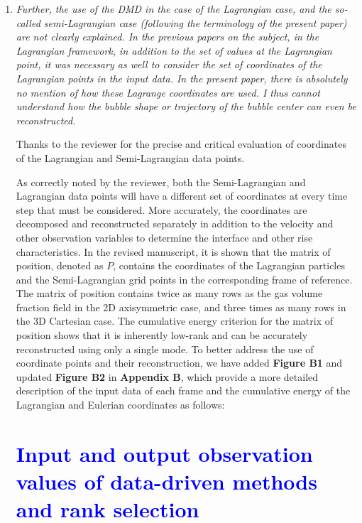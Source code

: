 \documentclass[a4paper]{article}
\begin{document}
\begin{enumerate}
\item
\textit{Further, the use of the DMD in the case of the Lagrangian case, and the so-called semi-Lagrangian case (following the terminology of the present paper) are not clearly explained. In the previous papers on the subject, in the Lagrangian framework, in addition to the set of values at the Lagrangian point, it was necessary as well to consider the set of coordinates of the Lagrangian points in the input data. In the present paper, there is absolutely no mention of how these Lagrange coordinates are used. I thus cannot understand how the bubble shape or trajectory of the bubble center can even be reconstructed.}
\vspace{.2cm}


Thanks to the reviewer for the precise and critical evaluation of coordinates of the Lagrangian and Semi-Lagrangian data points.

As correctly noted by the reviewer, both the Semi-Lagrangian and Lagrangian data points will have a different set of coordinates at every time step that must be considered. More accurately, the coordinates are decomposed and reconstructed separately in addition to the velocity and other observation variables to determine the interface and other rise characteristics. In the revised manuscript, it is shown that the matrix of position, denoted as $P$, contains the coordinates of the Lagrangian particles and the Semi-Lagrangian grid points in the corresponding frame of reference. The matrix of position contains twice as many rows as the gas volume fraction field in the 2D axisymmetric case, and three times as many rows in the 3D Cartesian case. The cumulative energy criterion for the matrix of position shows that it is inherently low-rank and can be accurately reconstructed using only a single mode. To better address the use of coordinate points and their reconstruction, we have added \textbf{Figure B1} and updated \textbf{Figure B2} in \textbf{Appendix B}, which provide a more detailed description of the input data of each frame and the cumulative energy of the Lagrangian and Eulerian coordinates as follows:

\appendix
\setcounter{section}{1}

\section{\textcolor{blue}{Input and output observation values of data-driven methods and rank selection}}
\label{Append_B}


\end{enumerate}
\end{document}
